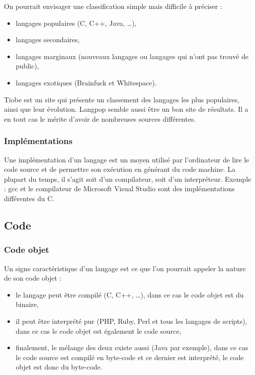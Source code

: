 On pourrait envisager une classification simple mais difficile à préciser :
\begin{itemize}
\item langages populaires (C, C++, Java, …),
\item langages secondaires,
\item langages marginaux (nouveaux langages ou langages qui n'ont pas trouvé de public),
\item langages exotiques (Brainfuck et Whitespace).\\
\end{itemize}

Tiobe \cite{bib_tiobe} est un site qui présente un classement des langages les plus populaires, ainsi que leur évolution.
Langpop \cite{bib_langpop} semble aussi être un bon site de résultats. Il a en tout cas le mérite d'avoir de nombreuses sources différentes.

\subsubsection{Implémentations}
\label{implementations}

Une implémentation d'un langage est un moyen utilisé par l'ordinateur de lire le code source et de permettre son exécution en générant du code machine. La plupart du temps, il s'agit soit d'un compilateur, soit d'un interpréteur. Exemple : gcc et le compilateur de Microsoft Visual Studio sont des implémentations différentes du C. \cite{bib_compl}

\subsection{Code}
\label{code}

\subsubsection{Code objet}
\label{objet}

Un signe caractéristique d'un langage est ce que l'on pourrait appeler la nature de son code objet :
\begin{itemize}
\item le langage peut être compilé (C, C++, …), dans ce cas le code objet est du binaire,
\item il peut être interprété pur (PHP, Ruby, Perl et tous les langages de scripts), dans ce cas le code objet est également le code source,
\item finalement, le mélange des deux existe aussi (Java par exemple), dans ce cas le code source est compilé en byte-code et ce dernier est interprété, le code objet est donc du byte-code.
\end{itemize}

